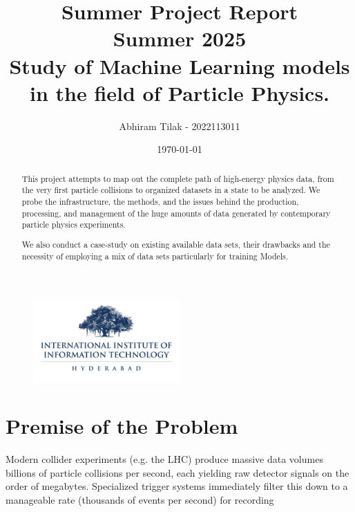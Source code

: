 \documentclass[letterpaper,12pt]{article}
\date{\today}
\newcommand\authormark[1]{\textsuperscript{#1}}
\begin{document}
\begin{spacing}{1.125}

    \title{\Large{Summer Project Report} \\ \normalsize{Summer 2025} \\ \vspace{1cm} \Huge{Study of Machine Learning models in the field of Particle Physics.
}}
\begin{figure}[H]
    \centering
\includegraphics[width=0.5\textwidth]{iiith_logo.png}
\end{figure}
\vspace{0.5cm}

\vspace{1cm}
\author{Abhiram Tilak - 2022113011}
\address{\authormark{*}International Instituite of Information Technology, Hyderabad}
\vspace{1cm}

\begin{abstract}
This project attempts to map out the complete path of high-energy physics data, from the very first particle collisions to organized datasets in a state to be analyzed. We probe the infrastructure, the methods, and the issues behind the production, processing, and management of the huge amounts of data generated by contemporary particle physics experiments.

We also conduct a case-study on existing available data sets, their drawbacks and the necessity of employing a mix of data sets particularly for training Models.
\end{abstract}

\pagebreak


\tableofcontents
\listoffigures
\listoftables

\section{Premise of the Problem}

Modern collider experiments (e.g. the LHC) produce massive data volumes billions of particle collisions per second, each yielding raw detector signals on the order of megabytes. Specialized trigger systems immediately filter this down to a manageable rate (thousands of events per second) for recording


\end{spacing}
\end{document}
